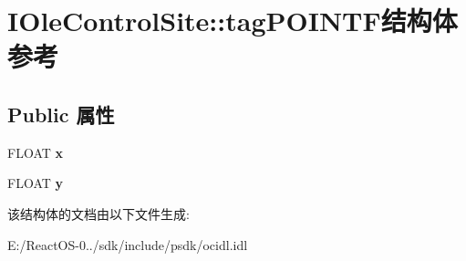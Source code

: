\hypertarget{struct_i_ole_control_site_1_1tag_p_o_i_n_t_f}{}\section{I\+Ole\+Control\+Site\+:\+:tag\+P\+O\+I\+N\+T\+F结构体 参考}
\label{struct_i_ole_control_site_1_1tag_p_o_i_n_t_f}
\subsection*{Public 属性}
\begin{DoxyCompactItemize}
\item 
\mbox{\label{struct_i_ole_control_site_1_1tag_p_o_i_n_t_f_a72c8719c7d842766c1dd84c5a7f290e1}} 
F\+L\+O\+AT {\bfseries x}
\item 
\mbox{\label{struct_i_ole_control_site_1_1tag_p_o_i_n_t_f_ae1301f52e16523016cbf2f5036c44ac0}} 
F\+L\+O\+AT {\bfseries y}
\end{DoxyCompactItemize}


该结构体的文档由以下文件生成\+:\begin{DoxyCompactItemize}
\item 
E\+:/\+React\+O\+S-\/0../sdk/include/psdk/ocidl.\+idl\end{DoxyCompactItemize}
